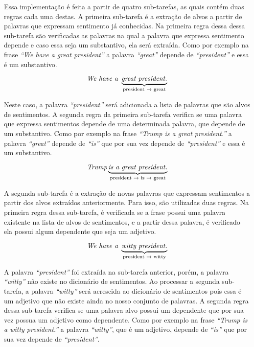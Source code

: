 Essa implementação é feita a partir de quatro sub-tarefas, as quais contém duas
regras cada uma destas. A primeira sub-tarefa é a extração de alvos a partir de
palavras que expressam sentimento já conhecidas. Na primeira regra dessa
dessa sub-tarefa são verificadas as palavras na qual a palavra que
expressa sentimento depende e caso essa seja um substantivo, ela será extraída. Como por exemplo na frase \textit{``We have
a great president''} a palavra \textit{``great''} depende de
\textit{``president''} e essa é um substantivo.

\[\textit{We have a } \underbrace{\textit{great president.}}_\text{president
\textrightarrow \text{ great}}\]

Neste caso, a palavra \textit{``president''} será adicionada a lista de
palavras que são alvos de sentimentos. A segunda regra da primeira sub-tarefa
verifica se uma palavra que expressa sentimentos depende de uma determinada
palavra, que depende de um substantivo. Como por exemplo na frase
\textit{``Trump is a great president.''} a palavra \textit{``great''} depende de
\textit{``is''} que por sua vez depende de \textit{``president''} e essa é um
substantivo.

\[\textit{Trump} \underbrace{\textit{is a great president.}}_\text{president
\textrightarrow \text{ is} \textrightarrow \text{ great}}\]

A segunda sub-tarefa é a extração de novas palavras que expressam sentimentos a
partir dos alvos extraídos anteriormente. Para isso, são utilizadas duas
regras. Na primeira regra dessa sub-tarefa, é verificada se a frase possui uma
palavra existente na lista de alvos de sentimentos, e a partir dessa palavra, é verificado ela possui algum
dependente que seja um adjetivo.


\[\textit{We have a } \underbrace{\textit{witty president.}}_\text{president
\textrightarrow \text{ witty}}\]

A palavra \textit{``president''} foi extraída na sub-tarefa
anterior, porém, a palavra \textit{``witty''} não existe no dicionário de
sentimentos. Ao processar a segunda sub-tarefa, a palavra \textit{``witty''}
será acrescida ao dicionário de sentimentos pois essa é um adjetivo que não
existe ainda no nosso conjunto de palavras. A segunda regra dessa sub-tarefa
verifica se uma palavra alvo possui um dependente que por sua vez possua um
adjetivo como dependente. Como por exemplo na frase
\textit{``Trump is a witty president.''} a palavra \textit{``witty''}, que é um
adjetivo, depende de \textit{``is''} que por sua vez depende de
\textit{``president''}.

